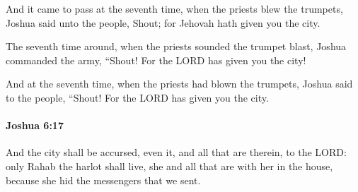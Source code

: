 			\begin{versebox}
					\item[BHS] 
					\item[ASV] And it came to pass at the seventh time, when the priests blew the trumpets, Joshua said unto the people, Shout; for Jehovah hath given you the city.
					\item[NIV] The seventh time around, when the priests sounded the trumpet blast, Joshua commanded the army, “Shout! For the LORD has given you the city!
					\item[NRSV] And at the seventh time, when the priests had blown the trumpets, Joshua said to the people, “Shout! For the LORD has given you the city.
			\end{versebox}

		\paragraph{Joshua 6:17} %
			\label{JOSHUA-6-17}

			And the city shall be accursed, even it, and all that are therein, to the LORD: only Rahab the harlot shall live, she and all that are with her in the house, because she hid the messengers that we sent.

